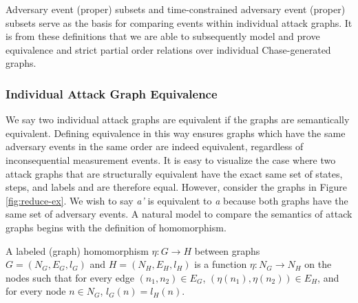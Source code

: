 \documentclass[runningheads]{llncs}
\theoremstyle{definition}
\begin{document}
Adversary event (proper) subsets and time-constrained adversary event (proper) subsets serve as the basis for comparing events within individual attack graphs. It is from these definitions that we are able to subsequently model and prove equivalence and strict partial order relations over individual Chase-generated graphs. 

\subsubsection*{Individual Attack Graph Equivalence}

We say two individual attack graphs are equivalent if the graphs are semantically equivalent. Defining equivalence in this way ensures graphs which have the same adversary events in the same order are indeed equivalent, regardless of inconsequential measurement events. It is easy to visualize the case where two attack graphs that are structurally equivalent have the exact same set of states, steps, and labels and are therefore equal. However, consider the graphs in Figure \ref{fig:reduce-ex}. We wish to say \emph{a'} is equivalent to \emph{a} because both graphs have the same set of adversary events. A natural model to compare the semantics of attack graphs begins with the definition of homomorphism.





\begin{definition}[Homomorphism]
    A labeled (graph) homomorphism $\eta : G \to H$ between graphs \\ $G = (N_G, E_G, l_G)$ and $H = (N_H, E_H, l_H)$ is a function $\eta : N_G \to N_H$ on the nodes such that for every edge $(n_1, n_2) \in E_G$, $(\eta(n_1), \eta(n_2)) \in E_H$, and for every node $n \in N_G$, $l_G(n) = l_H(n)$.  \cite{Rowe:2021:OnOrdering}
\end{definition}
\end{document}
